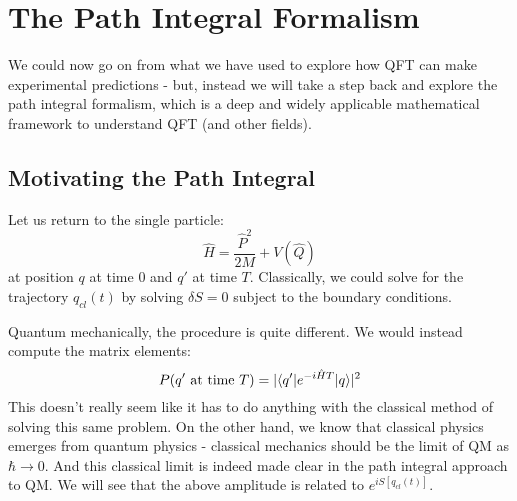 \section{The Path Integral Formalism}
We could now go on from what we have used to explore how QFT can make experimental predictions - but, instead we will take a step back and explore the path integral formalism, which is a deep and widely applicable mathematical framework to understand QFT (and other fields).

\subsection{Motivating the Path Integral}
Let us return to the single particle:
\begin{equation}
    \hat{H} = \frac{\hat{P}^2}{2M} + V(\hat{Q})
\end{equation}
at position $q$ at time $0$ and $q'$ at time $T$. Classically, we could solve for the trajectory $q_{cl}(t)$ by solving $\delta S = 0$ subject to the boundary conditions.

Quantum mechanically, the procedure is quite different. We would instead compute the matrix elements:
\begin{equation}
    P(q' \text{ at time $T$}) = \lvert \langle q' \rvert e^{-i\hat{H}T}\lvert q \rangle \rvert^2
\end{equation}
This doesn't really seem like it has to do anything with the classical method of solving this same problem. On the other hand, we know that classical physics emerges from quantum physics - classical mechanics should be the limit of QM as $\hbar \to 0$. And this classical limit is indeed made clear in the path integral approach to QM. We will see that the above amplitude is related to $e^{iS[q_{cl}(t)]}$.

